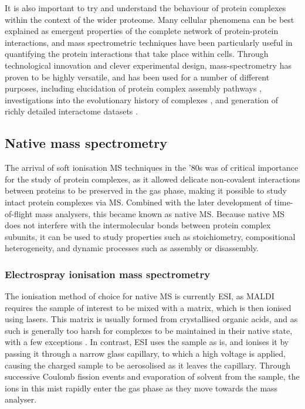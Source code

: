 \documentclass[a4paper,11pt,twoside,openright]{scrbook}
\begin{document}
It is also important to try and understand the behaviour of protein complexes within the context of the wider proteome. Many cellular phenomena can be best explained as emergent properties of the complete network of protein-protein interactions, and mass spectrometric techniques have been particularly useful in quantifying the protein interactions that take place within cells. Through technological innovation and clever experimental design, mass-spectrometry has proven to be highly versatile, and has been used for a number of different purposes, including elucidation of protein complex assembly pathways \cite{Levy2008,Marsh2013}, investigations into the evolutionary history of complexes \cite{Wan2015}, and generation of richly detailed interactome datasets \cite{Hein2015}.

\subsection{Native mass spectrometry}
The arrival of soft ionisation MS techniques in the '80s was of critical importance for the study of protein complexes, as it allowed delicate non-covalent interactions between proteins to be preserved in the gas phase, making it possible to study intact protein complexes via MS. Combined with the later development of time-of-flight mass analysers, this became known as native MS. Because native MS does not interfere with the intermolecular bonds between protein complex subunits, it can be used to study properties such as stoichiometry, compositional heterogeneity, and dynamic processes such as assembly or disassembly.

\subsubsection{Electrospray ionisation mass spectrometry}
The ionisation method of choice for native MS is currently ESI, as MALDI requires the sample of interest to be mixed with a matrix, which is then ionised using lasers. This matrix is usually formed from crystallised organic acids, and as such is generally too harsh for complexes to be maintained in their native state, with a few exceptions \cite{Song2007}. In contrast, ESI uses the sample as is, and ionises it by passing it through a narrow glass capillary, to which a high voltage is applied, causing the charged sample to be aerosolised as it leaves the capillary. Through successive Coulomb fission events and evaporation of solvent from the sample, the ions in this mist rapidly enter the gas phase as they move towards the mass analyser.
\end{document}
